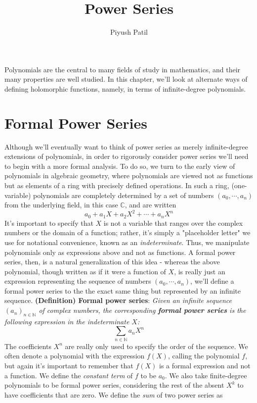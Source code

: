\documentclass{article}
\newcommand*{\tb}{\textbf}
\newcommand*{\ti}{\textit}
\newcommand*{\nn}{\newline \newline}
\newcommand*{\N}{\mathbb{N}}
\newcommand*{\C}{\mathbb{C}}
\begin{document}
\title{Power Series}
\author{Piyush Patil}
\maketitle

Polynomials are the central to many fields of study in mathematics, and their many properties are well studied. In this chapter, we'll look at alternate ways of defining holomorphic functions, namely, in terms of infinite-degree polynomials.

\section{Formal Power Series}
Although we'll eventually want to think of power series as merely infinite-degree extensions of polynomials, in order to rigorously consider power series we'll need to begin with a more formal analysis. To do so, we turn to the early view of polynomials in algebraic geometry, where polynomials are viewed not as functions but as elements of a ring with precisely defined operations. In such a ring, (one-variable) polynomials are completely determined by a set of numbers $ (a_0, \cdots, a_n) $ from the underlying field, in this case $ \C $, and are written
    $$ a_0 + a_1 X + a_2 X^2 + \cdots + a_n X^n $$
It's important to specify that $ X $ is not a variable that ranges over the complex numbers or the domain of a function; rather, it's simply a "placeholder letter" we use for notational convenience, known as an \ti{indeterminate}. Thus, we manipulate polynomials only as expressions above and not as functions. A formal power series, then, is a natural generalization of this idea - whereas the above polynomial, though written as if it were a function of $ X $, is really just an expression representing the sequence of numbers $ (a_0, \cdots, a_n) $, we'll define a formal power series to the the exact same thing but represented by an infinite sequence.
\nn
\tb{(Definition) Formal power series}: \ti{Given an infinite sequence $ (a_n)_{n \in \N} $ of complex numbers, the corresponding \tb{formal power series} is the following expression in the indeterminate $ X $:}
    $$ \sum_{n \in \N} a_n X^n $$
The coefficients $ X^n $ are really only used to specify the order of the sequence. We often denote a polynomial with the expression $ f(X) $, calling the polynomial $ f $, but again it's important to remember that $ f(X) $ is a formal expression and not a function. We define the \ti{constant term} of $ f $ to be $ a_0 $. We also take finite-degree polynomials to be formal power series, considering the rest of the absent $ X^k $ to have coefficients that are zero. We define the \ti{sum} of two power series as
\end{document}
